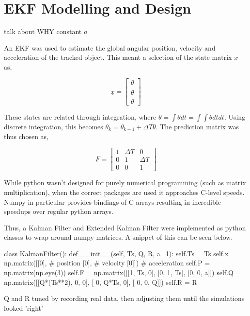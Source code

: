 \chapter{EKF Modelling and Design}

{\large \color{red} talk about WHY constant $a$}

An EKF was used to estimate the global angular position, velocity and acceleration of the tracked object. This meant a selection of the state matrix $x$ as,

$$ \underline{x} = \begin{bmatrix} \theta \\ \dot{\theta} \\ \ddot{\theta} \end{bmatrix} $$

These states are related through integration, where $\theta = \int{\dot{\theta} dt} = \int{\int{\ddot{\theta} dt}dt}$. Using discrete integration, this becomes $\theta_k = \theta_{k-1} + \Delta T \dot{\theta}$. The prediction matrix was thus chosen as,

$$ F = \begin{bmatrix} 1 & \Delta T & 0 \\
                       0 & 1 & \Delta T \\
					   0 & 0 & 1
		\end{bmatrix} $$

While python wasn't designed for purely numerical programming (such as matrix multiplication), when the correct packages are used it approaches C-level speeds. Numpy in particular provides bindings of C arrays resulting in incredible speedups over regular python arrays.

Thus, a Kalman Filter and Extended Kalman Filter were implemented as python classes to wrap around numpy matrices. A snippet of this can be seen below.

\begin{python}
class KalmanFilter():
    def __init__(self, Ts, Q, R, a=1):
        self.Ts = Ts
        self.x = np.matrix([[0],  # position
                            [0],  # velocity
                            [0]]) # acceleration
        self.P = np.matrix(np.eye(3))
        self.F = np.matrix([[1, Ts,  0],
                            [0,  1, Ts],
                            [0,  0,  a]])
        self.Q = np.matrix([[Q*(Ts**2),    0, 0],
                            [        0, Q*Ts, 0],
                            [        0,    0, Q]])
        self.R = R
\end{python}

{\Large \color{red} Q and R tuned by recording real data, then adjusting them until the simulations looked 'right'}


